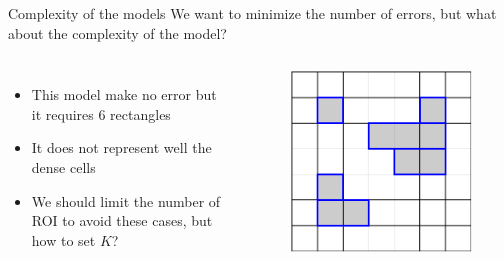 \documentclass[10pt]{beamer}
\begin{document}
\begin{frame}{Complexity of the models}
    We want to minimize the number of errors, but what about the complexity of the model?

    \begin{columns}[T, onlytextwidth]

        \begin{itemize}
            \item This model make no error but it requires $6$ rectangles
            \item It does not represent well the dense cells
            \item We should limit the number of ROI to avoid these cases, but how to set $K$?
        \end{itemize}


        \begin{figure}
            \centering
            \includegraphics[scale=0.5]{figures/running-example/MDL/example-model-complex.pdf}
        \end{figure}
    \end{columns}
\end{frame}
\end{document}
